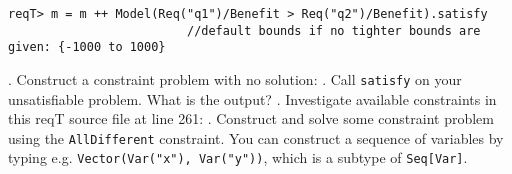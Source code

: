\documentclass[11pt]{article}
\begin{document}
\begin{framed}
{\begin{verbatim}
reqT> m = m ++ Model(Req("q1")/Benefit > Req("q2")/Benefit).satisfy
                         //default bounds if no tighter bounds are given: {-1000 to 1000}
\end{verbatim}}
. Construct a constraint problem with no solution:
\newline\newline
\newline{}. Call \verb+satisfy+ on your unsatisfiable problem. What is the output?  \newline
\newline{}. Investigate available constraints in this reqT source file at line 261: 
. Construct and solve some constraint problem using the \verb+AllDifferent+ constraint. You can construct a sequence of variables by typing e.g. \verb+Vector(Var("x"), Var("y"))+, which is a subtype of \verb+Seq[Var]+. 

\end{framed}
 










\end{document}
